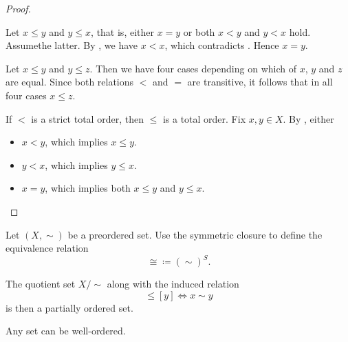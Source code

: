 \begin{proof}
\begin{description}
     Let \( x \leq y \) and \( y \leq x \), that is, either \( x = y \) or both \( x < y \) and \( y < x \) hold. Assume\LEM the latter. By , we have \( x < x \), which contradicts . Hence \( x = y \).

     Let \( x \leq y \) and \( y \leq z \). Then we have four cases depending on which of \( x \), \( y \) and \( z \) are equal. Since both relations \( < \) and \( = \) are transitive, it follows that in all four cases \( x \leq z \).

     If \( < \) is a strict total order, then \( \leq \) is a total order. Fix \( x, y \in X \). By , either
    \begin{itemize}
      \item \( x < y \), which implies \( x \leq y \).
      \item \( y < x \), which implies \( y \leq x \).
      \item \( x = y \), which implies both \( x \leq y \) and \( y \leq x \).
    \end{itemize}
  \end{description}
\end{proof}

\begin{proposition}\label{thm:preorder_to_partial_order}
  Let \( (X, \sim) \) be a preordered set. Use the symmetric closure to define the equivalence relation
  \begin{equation*}
    \cong \coloneqq (\sim)^S.
  \end{equation*}

  The quotient set \( X / \sim \) along with the induced relation
  \begin{equation*}
    [x] \leq [y] \iff x \sim y
  \end{equation*}
  is then a partially ordered set.
\end{proposition}

\begin{theorem}\label{thm:well_ordering_principle}\cite[196]{Enderton1977}
  Any set can be well-ordered.
\end{theorem}
